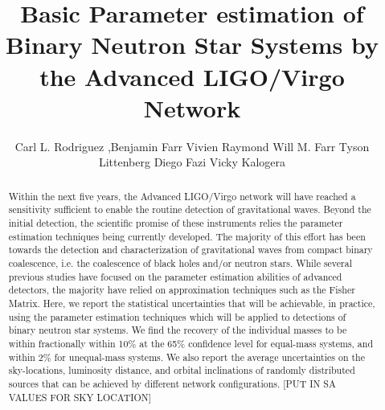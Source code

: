 \documentclass[11pt,a4paper]{emulateapj}
\newcommand{\carl}[1]{{\color{red}  #1}}
\begin{document}
\title{Basic Parameter estimation of Binary Neutron Star Systems by the Advanced LIGO/Virgo Network}
\author{Carl L. Rodriguez 
,Benjamin Farr 
Vivien Raymond 
Will M. Farr 
Tyson Littenberg
Diego Fazi
Vicky Kalogera}




\begin{abstract}

Within the next five years, the Advanced LIGO/Virgo network will have reached a sensitivity sufficient to enable the routine
 detection of gravitational waves.  Beyond the initial detection, the scientific promise of these instruments relies the 
 parameter estimation techniques being currently developed.  The majority of this effort has been towards the detection
   and characterization of gravitational waves from compact binary coalescence, i.e. the coalescence of black holes and/or 
   neutron stars.  While several previous studies have focused on the parameter estimation abilities of advanced detectors, 
   the majority have relied on approximation techniques such as the Fisher Matrix.  Here, we report the statistical 
   uncertainties that will be achievable, in practice, using the parameter estimation techniques which will be applied to 
   detections of binary neutron star systems.  We find the recovery of the individual masses to be within fractionally within 
   10\% at the 65\% confidence level for equal-mass systems, and within 2\% for unequal-mass systems.
     We also report the average uncertainties on the sky-locations, luminosity distance, and orbital inclinations of randomly 
     distributed sources that can be achieved by different network configurations. \carl{[PUT IN SA VALUES FOR SKY LOCATION]}
\end{abstract}

\maketitle
\end{document}

